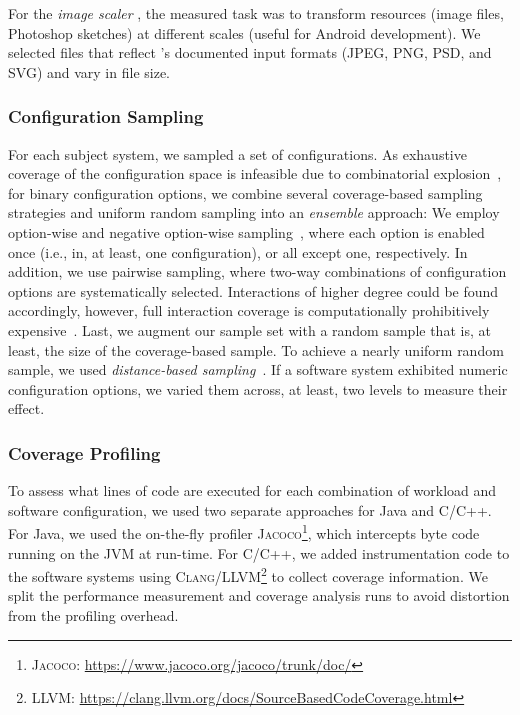 {{For the \textit{image scaler} \dconvert, the measured task was to transform resources (image files, Photoshop sketches) at different scales (useful for Android development). We selected files that reflect \dconvert's documented input formats (JPEG, PNG, PSD, and SVG) and vary in file size.
}

\subsubsection{Configuration Sampling}\label{sec:sampling}
For each subject system, we sampled a set of configurations. As exhaustive coverage of the configuration space is infeasible due to combinatorial explosion~\cite{henardCombining2015}, for binary configuration options, we combine several coverage-based sampling strategies and uniform random sampling into an \emph{ensemble} approach: 
We employ option-wise and negative option-wise sampling~\cite{siegmundPerformanceinfluenceModelsHighly2015}, where each option is enabled once (i.e., in, at least, one configuration), or all except one, respectively. In addition, we use pairwise sampling, where two-way combinations of configuration options are systematically selected. Interactions of higher degree could be found accordingly, however, full interaction coverage is computationally prohibitively expensive~\cite{henardCombining2015}. 
Last, we augment our sample set with a random sample that is, at least, the size of the coverage-based sample. To achieve a nearly uniform random sample, we used \emph{distance-based sampling}~\cite{kaltenecker_distance-based_2019}. If a software system exhibited numeric configuration options, we varied them across, at least, two levels to measure their effect.

\subsubsection{Coverage Profiling}\label{sec:profiling}
To assess what lines of code are executed for each combination of workload and software configuration, we used two separate approaches for Java and C/C++. For Java, we used the on-the-fly profiler \textsc{Jacoco}\footnote{\textsc{Jacoco}: \url{https://www.jacoco.org/jacoco/trunk/doc/}}, which intercepts byte code running on the JVM at run-time. For C/C++, we added instrumentation code to the software systems using \textsc{Clang/LLVM}\footnote{\textsc{LLVM}: \url{https://clang.llvm.org/docs/SourceBasedCodeCoverage.html}} to collect coverage information. We split the performance measurement and coverage analysis runs to  avoid distortion from the profiling overhead.
	
}
